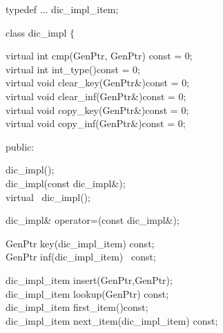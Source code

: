 typedef ... dic\_impl\_item;

class dic\_impl $\{$

\hspace*{.5cm}virtual int  cmp(GenPtr, GenPtr) const = 0;\\
\hspace*{.5cm}virtual int  int\_type()\hspace*{2.3cm}const = 0;\\
\hspace*{.5cm}virtual void clear\_key(GenPtr\&)\hspace*{.35cm}const = 0;\\
\hspace*{.5cm}virtual void clear\_inf(GenPtr\&)\hspace*{.45cm}const = 0;\\
\hspace*{.5cm}virtual void copy\_key(GenPtr\&)\hspace*{.35cm}const = 0;\\
\hspace*{.5cm}virtual void copy\_inf(GenPtr\&)\hspace*{.5cm}const = 0;

public:

\hspace*{.5cm}dic\_impl();\\
\hspace*{.5cm}dic\_impl(const dic\_impl\&);\\
\hspace*{.5cm}virtual ~dic\_impl();

\hspace*{.5cm}dic\_impl\& operator=(const dic\_impl\&);

\hspace*{.5cm}GenPtr key(dic\_impl\_item)  const;\\
\hspace*{.5cm}GenPtr inf(dic\_impl\_item)  \ const;

\hspace*{.5cm}dic\_impl\_item insert(GenPtr,GenPtr);\\
\hspace*{.5cm}dic\_impl\_item lookup(GenPtr)  const;\\
\hspace*{.5cm}dic\_impl\_item first\_item()\hspace*{1cm}const;\\
\hspace*{.5cm}dic\_impl\_item next\_item(dic\_impl\_item) const;

